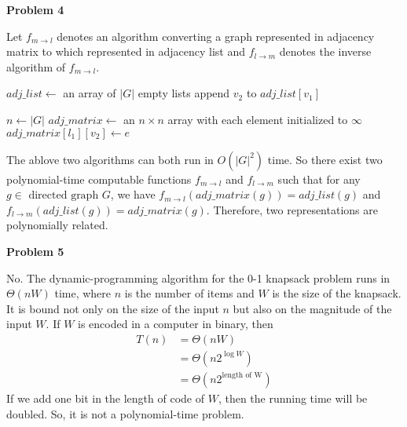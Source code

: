 \documentclass[12pt,letterpaper]{article}
\def\pp{\par\noindent}
\newcommand{\problem}[1]{ \bigskip \pp \textbf{Problem #1}\par}
\begin{document}
\problem{4}
Let $f_{m\to l}$ denotes an algorithm converting a graph represented in adjacency matrix to which represented in adjacency list and $f_{l\to m}$ denotes the inverse algorithm of $f_{m\to l}$.
\begin{algorithm}
	\caption{$f_{m\to l}$}
	\begin{algorithmic}[1]
		\STATE $adj\_list \leftarrow$ an array of $|G|$ empty lists
		\STATE append $v_2$ to $adj\_list[v_1]$
		\ENDIF
		\ENDFOR
		\ENDFOR
	\end{algorithmic}
\end{algorithm}
\begin{algorithm}
	\caption{$f_{l\to m}$}
	\begin{algorithmic}[1]
		\STATE $n \leftarrow |G|$
		\STATE $adj\_matrix \leftarrow$ an $n\times n$ array with each element initialized to $\infty$
		\STATE $adj\_matrix[l_1][v_2] \leftarrow e$
		\ENDFOR
		\ENDFOR
	\end{algorithmic}
\end{algorithm}
The ablove two algorithms can both run in $O(|G|^2)$ time. So there exist two polynomial-time computable functions $f_{m\to l}$ and $f_{l\to m}$ such that for any $g\in\text{ directed graph } G$, we have $f_{m\to l}(adj\_matrix(g))=adj\_list(g)$ and $f_{l\to m}(adj\_list(g))=adj\_matrix(g)$. Therefore, two representations are polynomially related.

\problem{5}
No. The dynamic-programming algorithm for the 0-1 knapsack problem runs in $\Theta(nW)$ time, where $n$ is the number of items and $W$ is the size of the knapsack. It is bound not only on the size of the input $n$ but also on the magnitude of the input $W$. If $W$ is encoded in a computer in binary, then
\begin{align*}
	T(n)&=\Theta(nW)\\
	&=\Theta(n2^{\log W})\\
	&=\Theta(n2^{\text{length of W}})
\end{align*}
If we add one bit in the length of code of $W$, then the running time will be doubled. So, it is not a polynomial-time problem.
\end{document}
